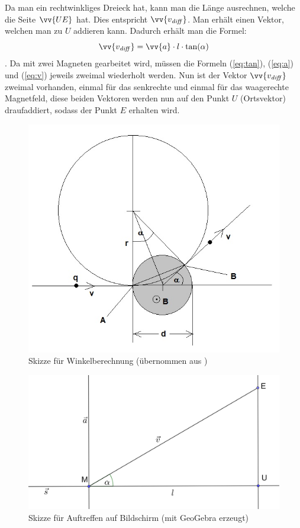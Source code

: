 Da man ein rechtwinkliges Dreieck hat, kann man die Länge ausrechnen, welche die Seite $\vv{UE}$ hat.
Dies entspricht $\vv{v_\mathit{diff}}$.
Man erhält einen Vektor, welchen man zu $U$ addieren kann.
Dadurch erhält man die Formel:
\begin{equation}
    \label{eq:v}
    \vv{v_\mathit{diff}} =  \vv{a} \cdot l \cdot \tan(\alpha)
\end{equation}.
Da mit zwei Magneten gearbeitet wird, müssen die Formeln (\ref{eq:tan}), (\ref{eq:a}) und (\ref{eq:v}) jeweils zweimal wiederholt werden.
Nun ist der Vektor $\vv{v_\mathit{diff}}$ zweimal vorhanden, einmal für das senkrechte und einmal für das waagerechte Magnetfeld, diese beiden Vektoren werden nun auf den Punkt $U$ (Ortsvektor) draufaddiert, sodass der Punkt $E$ erhalten wird.
\begin{figure}
    \centering
    \includegraphics[width=.75\textwidth]{fig/elektronenstrahl-ablenkung_101.jpg}
    \caption{Skizze für Winkelberechnung (übernommen aus \cite{Blog})}
    \label{fig:ausBlog}
\end{figure}

\begin{figure}
    \centering
    \includegraphics[width=.75\textwidth]{fig/Bildschirm_Skizze.png}
    \caption{Skizze für Auftreffen auf Bildschirm (mit GeoGebra erzeugt)}
    \label{fig:Schirm}
\end{figure}

